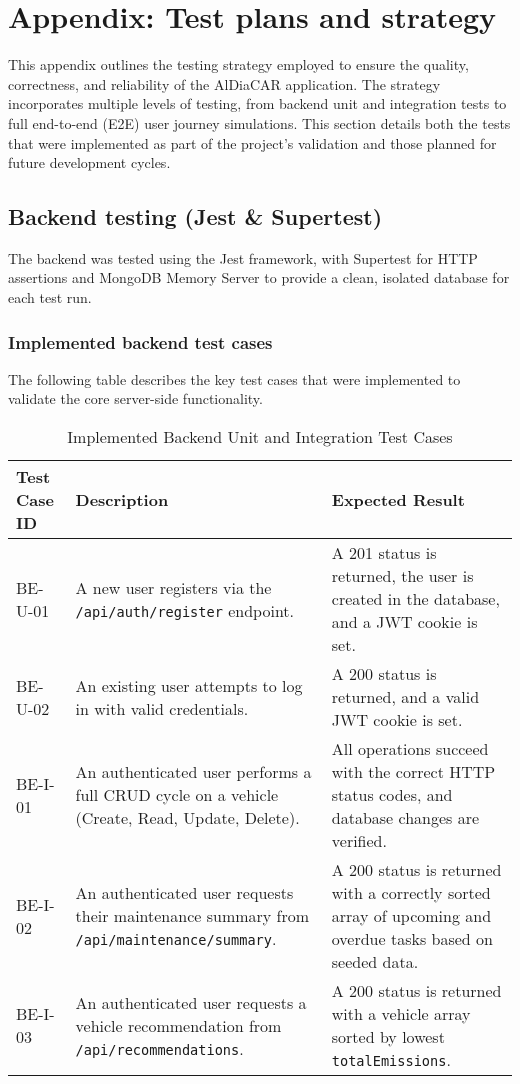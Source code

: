 \chapter{Appendix: Test plans and strategy}

This appendix outlines the testing strategy employed to ensure the quality, correctness, and reliability of the AlDiaCAR application. The strategy incorporates multiple levels of testing, from backend unit and integration tests to full end-to-end (E2E) user journey simulations. This section details both the tests that were implemented as part of the project's validation and those planned for future development cycles.

\section{Backend testing (Jest \& Supertest)}

The backend was tested using the Jest framework, with Supertest for HTTP assertions and MongoDB Memory Server to provide a clean, isolated database for each test run.

\subsection{Implemented backend test cases}
The following table describes the key test cases that were implemented to validate the core server-side functionality.

\begin{table}[h!]
    \centering
    \caption{Implemented Backend Unit and Integration Test Cases}
    \begin{tabular}{|p{}|p{}|p{}|}
        \hline
        \textbf{Test Case ID} & \textbf{Description} & \textbf{Expected Result} \\
        \hline \hline
        BE-U-01 & A new user registers via the \texttt{/api/auth/register} endpoint. & A 201 status is returned, the user is created in the database, and a JWT cookie is set. \\
        \hline
        BE-U-02 & An existing user attempts to log in with valid credentials. & A 200 status is returned, and a valid JWT cookie is set. \\
        \hline
        BE-I-01 & An authenticated user performs a full CRUD cycle on a vehicle (Create, Read, Update, Delete). & All operations succeed with the correct HTTP status codes, and database changes are verified. \\
        \hline
        BE-I-02 & An authenticated user requests their maintenance summary from \texttt{/api/maintenance/summary}. & A 200 status is returned with a correctly sorted array of upcoming and overdue tasks based on seeded data. \\
        \hline
        BE-I-03 & An authenticated user requests a vehicle recommendation from \texttt{/api/recommendations}. & A 200 status is returned with a vehicle array sorted by lowest \texttt{totalEmissions}. \\
        \hline
    \end{tabular}
\end{table}

